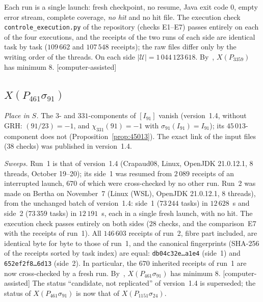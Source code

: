 \documentclass[11pt,a4paper]{amsart}
\theoremstyle{plain}
\theoremstyle{definition}
\newcommand{\XA}{X(P_{3359})}
\newcommand{\XB}{X(P_{461}\sigma_{91})}
\newcommand{\XC}{X(P_{1151}\sigma_{24})}
\newcommand{\st}[1]{\textup{\textsf{\small[#1]}}}
\newcommand{\ASS}{\st{computer-assisted}}
\begin{document}
Each run is a single launch: fresh checkpoint, no resume, Java exit code $0$, empty error stream, complete coverage, \emph{no hit} and no hit file. The execution check \texttt{controle\_execution.py} of the repository (checks E1--E7) passes entirely on each of the four executions, and the receipts of the two runs of each side are identical task by task ($109\,662$ and $107\,548$ receipts); the raw files differ only by the writing order of the threads. On each side $|\mathcal U|=1\,044\,123\,618$. By~\cite[Thm.~4.6]{Gau26}, $\XA$ has minimum $8$. \ASS

\subsection{\texorpdfstring{$\XB$}{X(P461 sigma91)}}\label{subsec:B}
\emph{Place in $S$.} The $3$- and $331$-components of $[I_{91}]$ vanish (version~1.4, without GRH: $(91/23)=-1$, and $\chi_{331}(91)=-1$ with $\sigma_{91}(I_{91})=I_{91}$); its $45\,013$-component does not (Proposition~\ref{prop:45013}). The exact link of the input files ($38$ checks) was published in version~1.4.

\emph{Sweeps.} Run~1 is that of version~1.4 (Crapaud08, Linux, OpenJDK 21.0.12.1, $8$ threads, October 19--20); its side~1 was resumed from $2\,089$ receipts of an interrupted launch, $670$ of which were cross-checked by no other run. Run~2 was made on Bertha on November~7 (Linux (WSL), OpenJDK 21.0.12.1, $8$ threads), from the unchanged batch of version~1.4: side~1 ($73\,244$ tasks) in $12\,628$~s and side~2 ($73\,359$ tasks) in $12\,191$~s, each in a single fresh launch, with no hit. The execution check passes entirely on both sides ($28$ checks, and the comparison~E7 with the receipts of run~1). All $146\,603$ receipts of run~2, fibre part included, are identical byte for byte to those of run~1, and the canonical fingerprints (SHA-256 of the receipts sorted by task index) are equal: \texttt{db04c32e\dots a1e4} (side~1) and \texttt{652ef2f8\dots 6d13} (side~2). In particular, the $670$ inherited receipts of run~1 are now cross-checked by a fresh run. By~\cite[Thm.~4.6]{Gau26}, $\XB$ has minimum $8$. \ASS{} The status ``candidate, not replicated'' of version~1.4 is superseded; the status of $\XB$ is now that of $\XC$.
\end{document}
